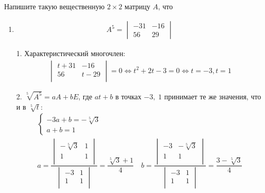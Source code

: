 		
		\subsection{}
		Напишите такую вещественную $2 \times 2$ матрицу $A$, что
		\begin{enumerate}
			\item
				\begin{gather*}
					A^{5} = 
					\begin{vmatrix}
						-31 & -16\\
						56 & 29
					\end{vmatrix}
				\end{gather*}
				
				1. Характеристический многочлен:
				\begin{gather*}
					\begin{vmatrix}
						t + 31 & -16\\ 
						56 & t - 29\\
					\end{vmatrix} 
					= 0 \Leftrightarrow 
					t^{2} + 2t - 3= 0 \Leftrightarrow 
					t = -3, t = 1
				\end{gather*}
				
				2. $\sqrt[5]{A^{5}} = aA + bE$, где $at + b$ в точках $-3, \; 1$ принимает те же значения, что и в $\sqrt[5]{t}:$
				\begin{gather*}
					\begin{cases}
						-3a + b = -\sqrt[5]{3}\\
						a + b = 1
					\end{cases}
				\\
					a = 
					\dfrac{
					\begin{vmatrix} 
						-\sqrt[5]{3} & 1\\ 
						1 & 1\\ 
					\end{vmatrix}
					}{
					\begin{vmatrix} 
						-3 & 1\\ 
						1 & 1\\ 
					\end{vmatrix}} 
					= \dfrac{\sqrt[5]{3} + 1}{4}
					\quad 
					b = 
					\dfrac{
					\begin{vmatrix} 
						-3 & -\sqrt[5]{3}\\
						1 & 1\\
					\end{vmatrix}
					}{
					\begin{vmatrix} 
						-3 & 1\\
						1 & 1\\
					\end{vmatrix}} 
					= \dfrac{3 - \sqrt[5]{3}}{4}
				\end{gather*}
				

\end{enumerate}
